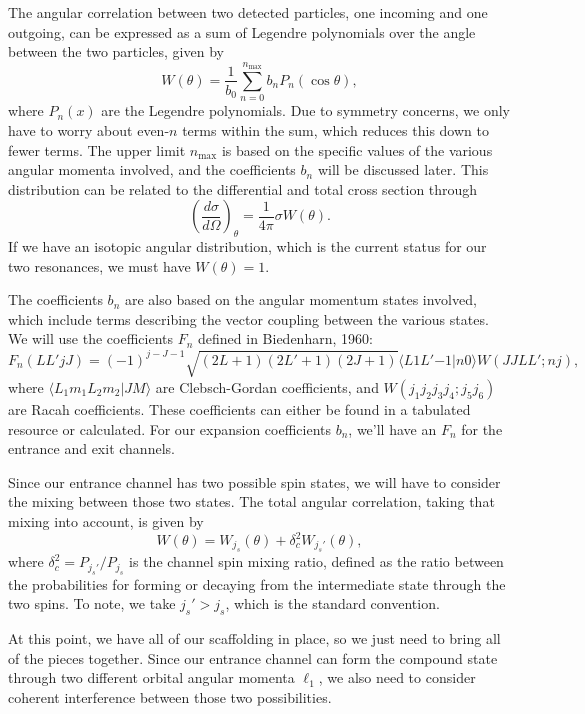 \documentclass[10pt]{amsart}
\numberwithin{equation}{subsection}
\begin{document}
The angular correlation between two detected particles, one incoming and one
outgoing, can be expressed as a sum of Legendre polynomials over the angle
between the two particles, given by
\begin{equation}
    \label{eq:angcorr}
    W(\theta) = \frac{1}{b_0}\sum_{n=0}^{n_{\textrm{max}}} b_nP_n(\cos\theta),
\end{equation}
where $P_n(x)$ are the Legendre polynomials. Due to symmetry concerns, we only
have to worry about even-$n$ terms within the sum, which reduces this down to
fewer terms. The upper limit $n_{\textrm{max}}$ is based on the specific values
of the various angular momenta involved, and the coefficients $b_n$ will be
discussed later. This distribution can be related to the differential and total
cross section through
\[
    \left(\frac{d\sigma}{d\Omega}\right)_{\theta} =
        \frac{1}{4\pi}\sigma W(\theta).
\]
If we have an isotopic angular distribution, which is the current status for
our two resonances, we must have $W(\theta) = 1$.

The coefficients $b_n$ are also based on the angular momentum states involved,
which include terms describing the vector coupling between the various states.
We will use the coefficients $F_n$ defined in Biedenharn, 1960:
\[
    F_n(LL'jJ) = (-1)^{j - J - 1}\sqrt{(2L + 1)(2L' + 1)(2J + 1)}
        \langle L1L'{-1}|n0\rangle W(JJLL';nj),
\]
where $\langle L_1m_1L_2m_2|JM\rangle$ are Clebsch-Gordan coefficients, and
$W(j_1j_2j_3j_4;j_5j_6)$ are Racah coefficients. These coefficients can either
be found in a tabulated resource or calculated. For our expansion coefficients
$b_n$, we'll have an $F_n$ for the entrance and exit channels.

Since our entrance channel has two possible spin states, we will have to
consider the mixing between those two states. The total angular correlation,
taking that mixing into account, is given by
\[
    W(\theta) = W_{j_s}(\theta) + \delta_c^2W_{j_s'}(\theta),
\]
where $\delta_c^2 = P_{j_s'} / P_{j_s}$ is the channel spin mixing ratio,
defined as the ratio between the probabilities for forming or decaying from the
intermediate state through the two spins. To note, we take $j_s' > j_s$, which
is the standard convention.

At this point, we have all of our scaffolding in place, so we just need to
bring all of the pieces together. Since our entrance channel can form the
compound state through two different orbital angular momenta $\ell_1$, we also
need to consider coherent interference between those two possibilities.
\end{document}
